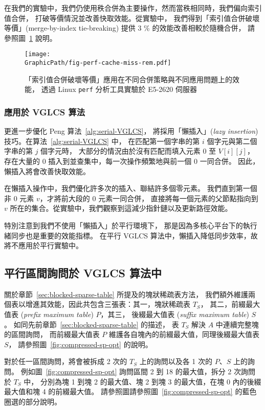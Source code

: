 在我們的實驗中，我們仍使用秩合併為主要操作，然而當秩相同時，我們偏向索引值合併，
打破等價情況並改善快取效能。從實驗中，
我們得到「索引值合併破壞等價」(merge-by-index tie-breaking) 提供 3 \% 的效能改善相較於隨機合併，
請參照圖~\ref{fig:fig-perf-cache-miss-rem} 說明。

\begin{figure}
  \centering
  \texttt{[image: \\GraphicPath/fig-perf-cache-miss-rem.pdf]}
  \caption{「索引值合併破壞等價」應用在不同合併策略與不同應用問題上的效能，
  透過 Linux {\tt perf} 分析工具實驗於 E5-2620 伺服器}
  \label{fig:fig-perf-cache-miss-rem}
\end{figure}

\subsubsection{應用於 VGLCS 算法}


更進一步優化 Peng 算法~\ref{alg:serial-VGLCS}，
將採用「懶插入」({\em lazy insertion}) 技巧。在算法~\ref{alg:serial-VGLCS} 中，
在匹配第一個字串的第 $i$ 個字元與第二個字串的第 $j$ 個字元時，
大部分的情況由於沒有匹配而填入元素 $0$ 至 $V[i][j]$，
存在大量的 $0$ 插入到並查集中，每一次操作頻繁地與前一個 $0$ 一同合併。
因此，懶插入將會改善快取效能。

在懶插入操作中，我們優化許多次的插入、聯結許多個零元素。
我們直到第一個非 $0$ 元素 $v$，才將前大段的 $0$ 元素一同合併，
直接將每一個元素的父節點指向到 $v$ 所在的集合。從實驗中，我們觀察到這減少指針鏈以及更新路徑效能。

特別注意到我們不使用「懶插入」於平行環境下，
那是因為多核心平台下的執行緒同步也是重要的效能指標。
在平行 VGLCS 算法中，懶插入降低同步效率，故將不應用於平行實驗中。

\subsection{平行區間詢問於 VGLCS 算法中}

關於章節~\ref{sec:blocked-sparse-table} 所提及的塊狀稀疏表方法，
我們額外維護兩個表以增進其效能，因此共包含三張表：其一，塊狀稀疏表 $T_S$，
其二，前綴最大值表 ({\em prefix maximum table}) $P$，其三，
後綴最大值表 ({\em suffix maximum table}) $S$。
如同先前章節~\ref{sec:blocked-sparse-table} 的描述，
表 $T_S$ 解決 $A$ 中連續完整塊的區間詢問，
而前綴最大值表 $P$ 維護各自塊內的前綴最大值，同理後綴最大值表 $S$，
請參照圖~\ref{fig:compressed-sp-opt} 的說明。

對於任一區間詢問，將會被拆成 2 次的 $T_S$ 上的詢問以及各 1 次的 $P$、$S$ 上的詢問。
例如圖~\ref{fig:compressed-sp-opt} 詢問區間 2 到 18 的最大值，拆分 2 次詢問於 $T_S$ 中，
分別為塊 1 到塊 2 的最大值、塊 2 到塊 3 的最大值，在塊 0 內的後綴最大值和塊 4 的前綴最大值。
請參照圖請參照圖~\ref{fig:compressed-sp-opt} 的藍色圈選的部分說明。

